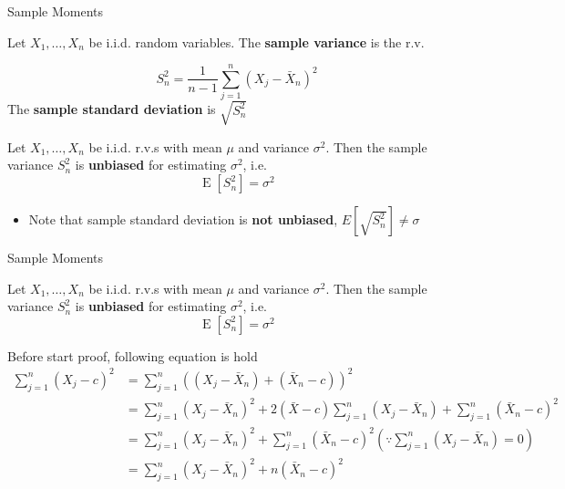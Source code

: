 \documentclass[8pt]{beamer}
\newcommand{\tb}[1]{\textbf{#1}}
\newcommand{\expec}[1]{\operatorname{E}\left[ #1 \right]}
\begin{document}
\begin{frame}{Sample Moments}
    \begin{definition}
        Let $X_1, \dots, X_n$ be i.i.d. random variables. The \tb{sample variance} is the r.v.

        \[
        S^2_n = \frac{1}{n-1} \sum_{j=1}^n (X_j - \bar{X}_n)^2
        \]
        The \tb{sample standard deviation} is $\sqrt{S^2_n}$
    \end{definition}

    \begin{theorem}
        Let $X_1, \dots, X_n$ be i.i.d. r.v.s with mean $\mu$ and variance $\sigma^2$. Then the sample variance $S^2_n$ is \tb{unbiased} for estimating $\sigma^2$, i.e.
        \[
            \expec{S^2_n} = \sigma^2
        \]
    \end{theorem}
    \begin{itemize}
        \item Note that sample standard deviation is \tb{not unbiased}, $E[\sqrt{S^2_n}] \neq \sigma$
    \end{itemize}
\end{frame}
\begin{frame}{Sample Moments}
    \begin{theorem}
        Let $X_1, \dots, X_n$ be i.i.d. r.v.s with mean $\mu$ and variance $\sigma^2$. Then the sample variance $S^2_n$ is \tb{unbiased} for estimating $\sigma^2$, i.e.
        \[
            \expec{S^2_n} = \sigma^2
        \]
    \end{theorem}

    Before start proof, following equation is hold
    \[
        \begin{aligned}
            \sum_{j=1}^n (X_j - c)^2 &=  \sum_{j=1}^n ((X_j - \bar{X}_n) + (\bar{X}_n - c))^2 \\
            &= \sum_{j=1}^n (X_j - \bar{X}_n)^2 + 2(\bar{X} - c) \sum_{j=1}^n (X_j - \bar{X}_n) + \sum_{j=1}^n (\bar{X}_n - c)^2 \\
            &= \sum_{j=1}^n (X_j - \bar{X}_n)^2 + \sum_{j=1}^n (\bar{X}_n - c)^2 \left(\because \sum_{j=1}^n (X_j - \bar{X}_n) = 0\right) \\
            &= \sum_{j=1}^n (X_j - \bar{X}_n)^2 + n (\bar{X}_n - c)^2
            \end{aligned}
    \]
\end{frame}
\end{document}
